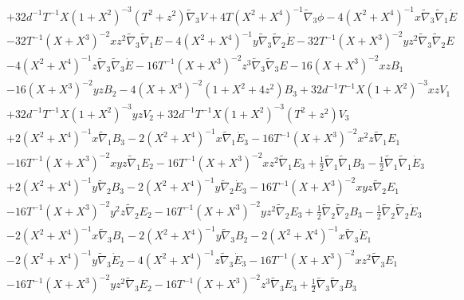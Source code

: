 \documentclass[10pt,letterpaper]{article}
\numberwithin{equation}{section}
\begin{document}
\begin{appendices}
\begin{eqnarray}
&& + 32 d^{-1} T^{-1} X (1 + X^2)^{-3} (T^2 + z^2) \tilde{\nabla}_{3}V + 4 T (X^2 + X^4)^{-1} \tilde{\nabla}_{3}\phi - 4 (X^2 + X^4)^{-1} x \tilde{\nabla}_{3}\tilde{\nabla}_{1}\dot{E} \nonumber \\ 
&& - 32 T^{-1} (X + X^3)^{-2} x z^2 \tilde{\nabla}_{3}\tilde{\nabla}_{1}E - 4 (X^2 + X^4)^{-1} y \tilde{\nabla}_{3}\tilde{\nabla}_{2}\dot{E} - 32 T^{-1} (X + X^3)^{-2} y z^2 \tilde{\nabla}_{3}\tilde{\nabla}_{2}E \nonumber \\ 
&& - 4 (X^2 + X^4)^{-1} z \tilde{\nabla}_{3}\tilde{\nabla}_{3}\dot{E} - 16 T^{-1} (X + X^3)^{-2} z^3 \tilde{\nabla}_{3}\tilde{\nabla}_{3}E-16 (X + X^3)^{-2} x z B_{1} \nonumber \\ 
&& - 16 (X + X^3)^{-2} y z B_{2} - 4 (X + X^3)^{-2} (1 + X^2 + 4 z^2) B_{3} + 32 d^{-1} T^{-1} X (1 + X^2)^{-3} x z V_{1} \nonumber \\ 
&& + 32 d^{-1} T^{-1} X (1 + X^2)^{-3} y z V_{2} + 32 d^{-1} T^{-1} X (1 + X^2)^{-3} (T^2 + z^2) V_{3} \nonumber \\ 
&& + 2 (X^2 + X^4)^{-1} x \tilde{\nabla}_{1}B_{3} - 2 (X^2 + X^4)^{-1} x \tilde{\nabla}_{1}\dot{E}_{3} - 16 T^{-1} (X + X^3)^{-2} x^2 z \tilde{\nabla}_{1}E_{1} \nonumber \\ 
&& - 16 T^{-1} (X + X^3)^{-2} x y z \tilde{\nabla}_{1}E_{2} - 16 T^{-1} (X + X^3)^{-2} x z^2 \tilde{\nabla}_{1}E_{3} + \tfrac{1}{2} \tilde{\nabla}_{1}\tilde{\nabla}_{1}B_{3} -  \tfrac{1}{2} \tilde{\nabla}_{1}\tilde{\nabla}_{1}\dot{E}_{3} \nonumber \\ 
&& + 2 (X^2 + X^4)^{-1} y \tilde{\nabla}_{2}B_{3} - 2 (X^2 + X^4)^{-1} y \tilde{\nabla}_{2}\dot{E}_{3} - 16 T^{-1} (X + X^3)^{-2} x y z \tilde{\nabla}_{2}E_{1} \nonumber \\ 
&& - 16 T^{-1} (X + X^3)^{-2} y^2 z \tilde{\nabla}_{2}E_{2} - 16 T^{-1} (X + X^3)^{-2} y z^2 \tilde{\nabla}_{2}E_{3} + \tfrac{1}{2} \tilde{\nabla}_{2}\tilde{\nabla}_{2}B_{3} -  \tfrac{1}{2} \tilde{\nabla}_{2}\tilde{\nabla}_{2}\dot{E}_{3} \nonumber \\ 
&& - 2 (X^2 + X^4)^{-1} x \tilde{\nabla}_{3}B_{1} - 2 (X^2 + X^4)^{-1} y \tilde{\nabla}_{3}B_{2} - 2 (X^2 + X^4)^{-1} x \tilde{\nabla}_{3}\dot{E}_{1} \nonumber \\ 
&& - 2 (X^2 + X^4)^{-1} y \tilde{\nabla}_{3}\dot{E}_{2} - 4 (X^2 + X^4)^{-1} z \tilde{\nabla}_{3}\dot{E}_{3} - 16 T^{-1} (X + X^3)^{-2} x z^2 \tilde{\nabla}_{3}E_{1} \nonumber \\ 
&& - 16 T^{-1} (X + X^3)^{-2} y z^2 \tilde{\nabla}_{3}E_{2} - 16 T^{-1} (X + X^3)^{-2} z^3 \tilde{\nabla}_{3}E_{3} + \tfrac{1}{2} \tilde{\nabla}_{3}\tilde{\nabla}_{3}B_{3} \nonumber \\ 

\end{eqnarray}
\end{appendices}
\end{document}
